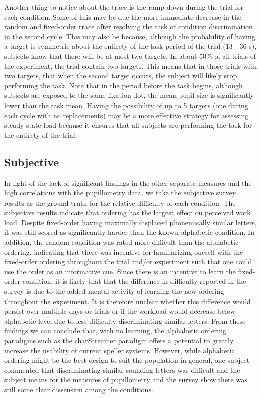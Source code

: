 \documentclass[10pt]{article}
\begin{document}
Another thing to notice about the trace is the ramp down
during the trial for each condition.  Some of this may be due
the more immediate decrease in the random and fixed-order
trace after resolving the task of condition discrimination in
the second cycle. This may also be because, although the
probability of having a target is symmetric about the entirety
of the task period of the trial (13 - 36 s), subjects know
that there will be at most two targets.  In about 50\% of all
trials of the experiment, the trial contain two targets. This
means that in those trials with two targets, that when the
second target occurs, the subject will likely stop performing
the task.  Note that in the period before the task begins,
although subjects are exposed to the same fixation dot, the
mean pupil size is significantly lower than the task mean.
Having the possibility of up to 5 targets (one during each
cycle with no replacements) may be a more effective strategy
for assessing steady state load because it ensures that all
subjects are performing the task for the entirety of the
trial.

\subsection{Subjective}

In light of the lack of significant findings in the other
separate measures and the high correlations with the
pupillometry data, we take the subjective survey results as
the ground truth for the relative difficulty of each
condition.  The subjective results indicate that ordering has
the largest effect on perceived work load. Despite fixed-order
having maximally displaced phonemically similar letters, it
was still scored as significantly harder than the known
alphabetic condition.  In addition, the random condition was
rated more difficult than the alphabetic ordering, indicating
that there was incentive for familiarizing oneself with the
fixed-order ordering throughout the trial and/or experiment
such that one could use the order as an informative cue.
Since there is an incentive to learn the fixed-order
condition, it is likely that that the difference in difficulty
reported in the survey is due to the added mental activity of
learning the new ordering throughout the experiment. It is
therefore unclear whether this difference would persist over
multiple days or trials or if the workload would decrease
below alphabetic level due to less difficulty discriminating
similar letters.  From these findings we can conclude that,
with no learning, the alphabetic ordering paradigms such as
the charStreamer paradigm offers a potential to greatly
increase the usability of current speller systems.  However,
while alphabetic ordering might be the best design to suit the
population in general, one subject commented that
discriminating similar sounding letters was difficult and the
subject means for the measures of pupillometry and the survey
show there was still some clear dissension among the conditions. 
\end{document}
